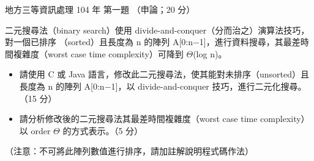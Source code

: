 \begin{pastexam}[label={px:df3-104-ds-01}]{地方三等資訊處理 104 年 第一題}
（申論；20 分）

二元搜尋法（binary search）使用 divide-and-conquer（分而治之）演算法技巧，對一個已排序
（sorted）且長度為 n 的陣列 A[0:n$-$1]，進行資料搜尋，其最差時間複雜度（worst case time
complexity）可降到 $\Theta$(log n)。
\begin{itemize}[leftmargin=2em, labelsep=0.3em, itemsep=2pt]
\item[㈠] 請使用 C 或 Java 語言，修改此二元搜尋法，使其能對未排序（unsorted）且長度為 n 的陣列
A[0:n$-$1]，以 divide-and-conquer 技巧，進行二元化搜尋。（15 分）
\item[㈡] 請分析修改後的二元搜尋法其最差時間複雜度（worst case time complexity）以 order
$\Theta$ 的方式表示。（5 分）
\end{itemize}
（注意：不可將此陣列數值進行排序，請加註解說明程式碼作法）
\end{pastexam}

